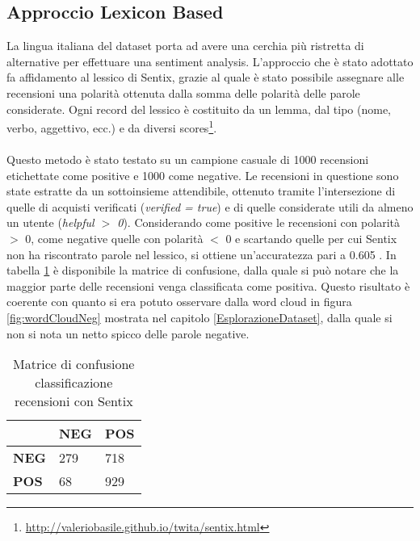 \subsection{Approccio Lexicon Based}\label{ApproccioLexiconBased}
La lingua italiana del dataset porta ad avere una cerchia più ristretta di alternative per effettuare una sentiment analysis. L'approccio che è stato adottato fa affidamento al lessico di Sentix, grazie al quale è stato possibile assegnare alle recensioni una polarità ottenuta dalla somma delle polarità delle parole considerate. Ogni record del lessico è costituito da un lemma, dal tipo (nome, verbo, aggettivo, ecc.) e da diversi scores\footnote{\url{http://valeriobasile.github.io/twita/sentix.html}}. 
\\\\
Questo metodo è stato testato su un campione casuale di 1000 recensioni etichettate come positive e 1000 come negative. Le recensioni in questione sono state estratte da un sottoinsieme attendibile, ottenuto tramite l'intersezione di quelle di acquisti verificati (\textit{verified = true}) e di quelle considerate utili da almeno un utente (\textit{helpful $>$ 0}). Considerando come positive le recensioni con polarità $>$ 0, come negative quelle con polarità $<$ 0 e scartando quelle per cui Sentix non ha riscontrato parole nel lessico, si ottiene un'accuratezza pari a 0.605 . In tabella \ref{tab:matriceConfusione} è disponibile la matrice di confusione, dalla quale si può notare che la maggior parte delle recensioni venga classificata come positiva. Questo risultato è coerente con quanto si era potuto osservare dalla word cloud in figura \ref{fig:wordCloudNeg} mostrata nel capitolo \ref{EsplorazioneDataset}, dalla quale si non si nota un netto spicco delle parole negative.

\begin{table}[H]
    \centering
    \begin{tabular}{l|l|l|}
    \cline{2-3}
     & \textbf{NEG} & \textbf{POS} \\ \hline
    \multicolumn{1}{|l|}{\textbf{NEG}} & 279 & 718 \\ \hline
    \multicolumn{1}{|l|}{\textbf{POS}} & 68 & 929 \\ \hline
    \end{tabular}
    \caption{Matrice di confusione classificazione recensioni con Sentix}
    \label{tab:matriceConfusione}
\end{table}


